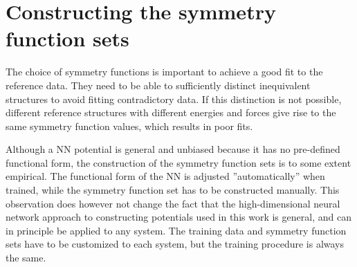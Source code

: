 \documentclass[twoside,english]{uiofysmaster}
\begin{document}
\section{Constructing the symmetry function sets}
The choice of symmetry functions is important to achieve a good fit to the reference data. 
They need to be able to sufficiently distinct inequivalent structures to avoid fitting 
contradictory data. If this distinction is not possible, different reference structures with 
different energies and forces give rise to the same symmetry function values, which results in poor fits. 

Although a NN potential is general and unbiased because it has no pre-defined functional form, the 
construction of the symmetry function sets is to some extent empirical. The functional form of the NN
is adjusted ''automatically'' when trained, while the symmetry function set has to be constructed manually.
This observation does however not change the fact that the high-dimensional neural network approach to
constructing potentials used in this work is general, and can in principle be applied to any system. The training data
and symmetry function sets have to be customized to each system, but the training procedure is always the same. 
\end{document}
